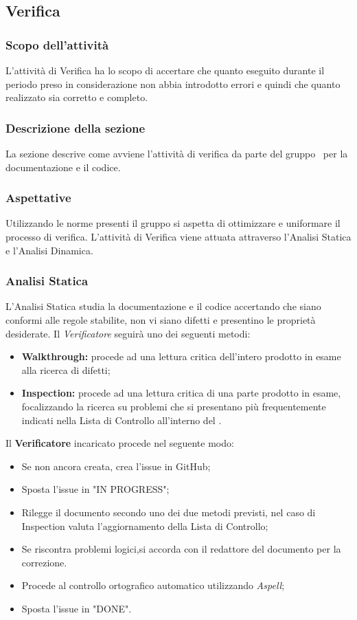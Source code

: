 \subsection{Verifica}\label{Verifica}
\subsubsection{Scopo dell'attività} \label{PSup_Verifica_Scopo}
L'attività di Verifica ha lo scopo di accertare che quanto eseguito durante il periodo preso in considerazione non abbia introdotto errori e quindi che quanto realizzato sia corretto e completo.
\subsubsection{Descrizione della sezione} 
La sezione descrive come avviene l'attività di verifica da parte del gruppo \Gruppo\ per la documentazione e il codice.
\subsubsection{Aspettative}
Utilizzando le norme presenti il gruppo si aspetta di ottimizzare e uniformare il processo di verifica. 
L'attività di Verifica viene attuata attraverso l'Analisi Statica e l'Analisi Dinamica. 
\subsubsection{Analisi Statica}
L'Analisi Statica studia la documentazione e il codice accertando che siano conformi alle regole stabilite, non vi siano difetti e presentino le proprietà desiderate.
Il \textit{Verificatore} seguirà uno dei seguenti metodi:
\begin{itemize}
	\item \textbf{Walkthrough:} procede ad una lettura critica dell'intero prodotto in esame alla ricerca di difetti;
	\item \textbf{Inspection:} procede ad una lettura critica di una parte prodotto in esame, focalizzando la ricerca su problemi che si presentano più frequentemente indicati nella Lista di Controllo all'interno del \PdQv{}.
\end{itemize}

\label{VerificaDocumentazione}
Il \textbf{Verificatore} incaricato procede nel seguente modo:
\begin{itemize}
	\item Se non ancora creata, crea l'issue in GitHub;
	\item Sposta l'issue in "IN PROGRESS";
	\item Rilegge il documento secondo uno dei due metodi previsti, nel caso di Inspection valuta l'aggiornamento della Lista di Controllo;
	\item Se riscontra problemi logici,si accorda con il redattore del documento per la correzione. 
	\item Procede al controllo ortografico automatico utilizzando \textit{Aspell};
	\item Sposta l'issue in "DONE".
\end{itemize}

